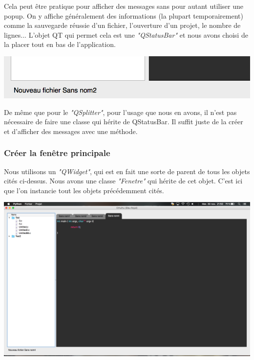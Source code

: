 \documentclass[a4paper,12pt]{article}
\begin{document}
			 	Cela peut être pratique pour afficher des messages sans pour autant utiliser une popup. On y affiche généralement des informations (la plupart temporairement) comme la sauvegarde réussie d'un fichier, l'ouverture d'un projet, le nombre de lignes... L'objet QT qui permet cela est une \textit{"QStatusBar"} et nous avons choisi de la placer tout en bas de l'application.\\
			\begin{center}
				\includegraphics[scale=0.6]{images/QStatusBar}
				\vspace{0.6cm}
			\end{center}
			De même que pour le \textit{"QSplitter"}, pour l'usage que nous en avons, il n'est pas nécessaire de faire une classe qui hérite de QStatusBar. Il suffit juste de la créer et d'afficher des messages avec une méthode.\\
			
			\subsubsection*{Créer la fenêtre principale}
			
				Nous utilisons un \textit{"QWidget"}, qui est en fait une sorte de parent de tous les objets cités ci-dessus. Nous avons une classe \textit{"Fenetre"} qui hérite de cet objet. C'est ici que l'on instancie tout les objets précédemment cités.\\
			\begin{center}
				\includegraphics[scale=0.2]{images/QWidget}
				\vspace{0.6cm}
			\end{center}
			
\end{document}
